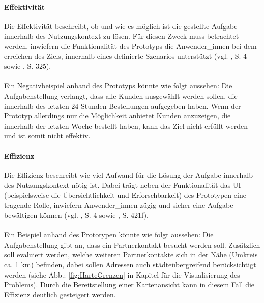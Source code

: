 \documentclass[Bachelorarbeit.tex]{subfiles}
\begin{document}
\paragraph{Effektivität}
Die Effektivität beschreibt, ob und wie es möglich ist die gestellte Aufgabe innerhalb des Nutzungskontext zu lösen.
Für diesen Zweck muss betrachtet werden, inwiefern die Funktionalität des Prototyps die Anwender\_innen bei dem erreichen des Ziels, innerhalb eines definierte Szenarios unterstützt (vgl. \cite{Iso9241_11}, S. 4 sowie \cite{Burmester}, S. 325). \\
\\
Ein Negativbeispiel anhand des Prototyps könnte wie folgt aussehen:
Die Aufgabenstellung verlangt, dass alle Kunden ausgewählt werden sollen, die innerhalb des letzten 24 Stunden Bestellungen aufgegeben haben. 
Wenn der Prototyp allerdings nur die Möglichkeit anbietet Kunden anzuzeigen, die innerhalb der letzten Woche bestellt haben, kann das Ziel nicht erfüllt werden und ist somit nicht effektiv.

\paragraph{Effizienz}
Die Effizienz beschreibt wie viel Aufwand für die Lösung der Aufgabe innerhalb des Nutzungskontext nötig ist. 
Dabei trägt neben der Funktionalität das \ac{UI} (beispielsweise die Übersichtlichkeit und Erforschbarkeit) des Prototypen eine tragende Rolle, inwiefern Anwender\_innen zügig und sicher eine Aufgabe bewältigen können (vgl. \cite{Iso9241_11}, S. 4 sowie \cite{Niegemann2008}, S. 421f).\\
\\
Ein Beispiel anhand des Prototypen könnte wie folgt aussehen:
Die Aufgabenstellung gibt an, dass ein Partnerkontakt besucht werden soll. Zusätzlich soll evaluiert werden, welche weiteren Partnerkontakte sich in der Nähe (Umkreis ca. 1 km) befinden, dabei sollen Adressen auch städteübergreifend  berücksichtigt werden (siehe Abb.: \ref{fig:HarteGrenzen} in Kapitel  für die Visualisierung des Problems).
Durch die Bereitstellung einer Kartenansicht kann in diesem Fall die Effizienz deutlich gesteigert werden. 
\end{document}
